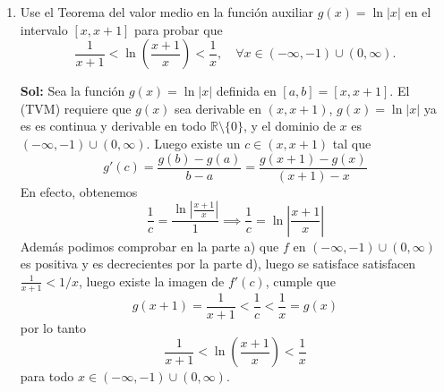 \documentclass[letterpaper,12pt]{article}
\theoremstyle{plain}
\theoremstyle{definition}
\begin{document}
\begin{enumerate}
\begin{enumerate}
Ahora vemos que la función tiene dos discontinuidades, $x=0$ y $x=-1$. Para el caso $x=0$, como $\displaystyle \lim_{x \to 0} f(x) = \infty$, esta es discontinuidad no es reparable. Luego en $x=-1$, estudiamos el límite:
    \[
    \lim_{x \to -1} (x + 1) \ln \left| \frac{x + 1}{x} \right|
    \]
    Esto es una indeterminación $0 \cdot (-\infty)$. Usemos el cambio de variable $u = x+1$.
    \[
    \lim_{u \to 0} u \ln \left| \frac{u}{u-1} \right| = \lim_{u \to 0} (u \ln|u| - u \ln|u-1|)
    \]
    Ahora para resolver cada uno de los límites vamos a usar l'hopital, tenemos que 
    $$
    \lim_{u \to 0} u \ln|u|=  \lim_{u \to 0} \frac{\ln|u|}{1/u} \xrightarrow{l'hopital} \lim_{u \to 0} \frac{\frac{1}{u}}{-1/u^2} =\lim_{u \to 0} -u  = 0
    $$
    $$
     \lim_{u \to 0} -u \ln|u-1| = \lim_{u \to 0} \frac{\ln|u-1|}{1/u} \xrightarrow{l'hopital} \lim_{u \to 0} \frac{\frac{1}{u-1}}{-1/u^2} = 0$$
Por lo tanto la discontinuidad en $x=-1$ es removible o reparable, ya que el límite existe y es $0$. Definamos entonces $f(x)$ como
\[
f(x) = 
\begin{cases} 
    (x + 1) \ln \left| \frac{x + 1}{x} \right| & \text{si } x \in \mathbb{R} \setminus \{-1, 0\} \\
    0 & \text{si } x = -1 
\end{cases}
\]
\color{black}
    
    \item Use el Teorema del valor medio en la función auxiliar $g(x) = \ln|x|$ en el intervalo $[x, x + 1]$ para probar que
    \[
    \frac{1}{x + 1} < \ln \left( \frac{x + 1}{x} \right) < \frac{1}{x}, \quad \forall x \in (-\infty, -1) \cup (0, \infty).
    \]
    
    \color{blue}
\textbf{Sol:} Sea la función $g(x) = \ln|x|$ definida en $[a, b] = [x, x + 1]$.
El (TVM) requiere que $g(x)$ sea derivable en $(x, x + 1)$, $g(x) = \ln|x|$ ya es es continua y derivable en todo $\mathbb{R} \setminus \{0\}$, y el dominio de $x$ es $(-\infty, -1) \cup (0, \infty)$. Luego existe un $c \in (x, x + 1)$ tal que
\[
g'(c) = \frac{g(b) - g(a)}{b - a} = \frac{g(x + 1) - g(x)}{(x + 1) - x}
\]
En efecto, obtenemos
\[
\frac{1}{c} = \frac{\ln \left| \frac{x + 1}{x} \right|}{1} \implies \frac{1}{c} = \ln \left| \frac{x + 1}{x} \right|
\]
Además podimos comprobar en la parte a) que $f$ en $(-\infty , -1) \cup (0, \infty)$ es positiva y es decrecientes por la parte d), luego se satisface satisfacen $\frac{1}{x+1} < 1/x$, luego existe la imagen de $f'(c)$, cumple que
\[
g(x+1)= \frac{1}{x + 1} < \frac{1}{c} < \frac{1}{x} = g(x)
\]
por lo tanto
\[
\frac{1}{x + 1} < \ln \left( \frac{x + 1}{x} \right) < \frac{1}{x}
\]
 para todo $x \in (-\infty, -1) \cup (0, \infty)$.
\color{black}
    

\end{enumerate}
\end{enumerate}
\end{document}
